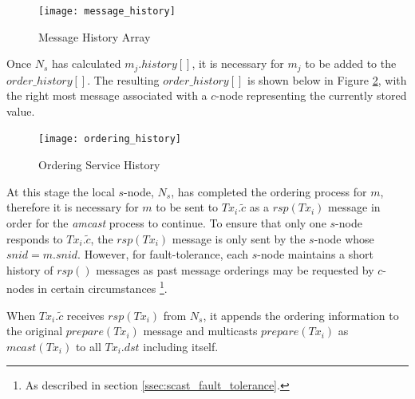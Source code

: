 \begin{enumerate}
    \begin{figure}[htbp!] 
        \centering    
         \texttt{[image: message\_history]}
         \caption[Message History Array]{Message History Array}
         \label{fig:message_history}
    \end{figure}            
        
        Once $N_s$ has calculated $m_j.history[]$, it is necessary for $m_j$ to be added to the $order\_history[]$.  The resulting $order\_history[]$ is shown below in Figure \ref{fig:ordering_history}, with the right most message associated with a $c$-node representing the currently stored value.  
		
        \begin{figure}[htbp!] 
        \centering    
         \texttt{[image: ordering\_history]}
         \caption[Ordering Service History]{Ordering Service History}
         \label{fig:ordering_history}
    \end{figure}            
        
		
        At this stage the local $s$-node, $N_s$, has completed the ordering process for $m$, therefore it is necessary for $m$ to be sent to $Tx_i.\tilde{c}$ as a $rsp(Tx_i)$ message in order for the \emph{amcast} process to continue.  To ensure that only one $s$-node responds to $Tx_i.\tilde{c}$, the $rsp(Tx_i)$ message is only sent by the $s$-node whose $snid = m.snid$.  However, for fault-tolerance, each $s$-node maintains a short history of $rsp()$ messages as past message orderings may be requested by $c$-nodes in certain circumstances \footnote{As described in section \ref{ssec:scast_fault_tolerance}.}.          
        
        \leftbar
        When $Tx_i.\tilde{c}$ receives $rsp(Tx_i)$ from $N_s$, it appends the ordering information to the original $prepare(Tx_i)$ message and multicasts $prepare(Tx_i)$ as $mcast(Tx_i)$ to all $Tx_i.dst$ including itself. 
        \endleftbar
        

\end{enumerate}
